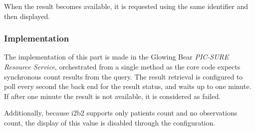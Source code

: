 When the result becomes available, it is requested using the same identifier and then displayed.


\subsubsection*{Implementation}

The implementation of this part is made in the Glowing Bear \emph{PIC-SURE Resource Service}, orchestrated from a single method as the core code expects synchronous count results from the query.
The result retrieval is configured to poll every second the back end for the result status, and waits up to one minute.
If after one minute the result is not available, it is considered as failed.

Additionally, because i2b2 supports only patients count and no observations count, the display of this value is disabled through the configuration.

